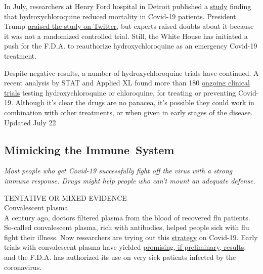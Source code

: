 In July, researchers at Henry Ford hospital in Detroit published a
\href{https://www.statnews.com/2020/07/08/a-flawed-covid-19-study-gets-the-white-houses-attention-and-the-fda-may-pay-the-price/}{study}
finding that hydroxychloroquine reduced mortality in Covid-19 patients.
President Trump
\href{https://twitter.com/realDonaldTrump/status/1280328830218051584}{praised
the study on Twitter}, but experts raised doubts about it because it was
not a randomized controlled trial. Still, the White House has initiated
a push for the F.D.A. to reauthorize hydroxychloroquine as an emergency
Covid-19 treatment.

Despite negative results, a number of hydroxychloroquine trials have
continued. A recent analysis by STAT and Applied XL found more than 180
\href{https://www.statnews.com/2020/07/06/data-show-panic-and-disorganization-dominate-the-study-of-covid-19-drugs/}{ongoing
clinical trials} testing hydroxychloroquine or chloroquine, for treating
or preventing Covid-19. Although it's clear the drugs are no panacea,
it's possible they could work in combination with other treatments, or
when given in early stages of the disease.\\
Updated July 22

\hypertarget{mimicking-the-immune-system}{%
\subsection{Mimicking the
Immune~System}\label{mimicking-the-immune-system}}

\emph{Most people who get Covid-19 successfully fight off the virus with
a strong immune response. Drugs might help people who can't mount an
adequate defense.}

TENTATIVE OR MIXED EVIDENCE\\
Convalescent plasma\\
A century ago, doctors filtered plasma from the blood of recovered flu
patients. So-called convalescent plasma, rich with antibodies, helped
people sick with flu fight their illness. Now researchers are trying out
this
\href{https://www.nytimes.com/2020/04/24/smarter-living/coronavirus-convalescent-plasma-antibodies.html?searchResultPosition=1}{strategy}
on Covid-19. Early trials with convalescent plasma have yielded
\href{https://www.nytimes.com/2020/05/22/health/coronarvirus-convalescent-serum.html?searchResultPosition=2}{promising,
if preliminary, results}, and the F.D.A. has authorized its use on very
sick patients infected by the coronavirus.

